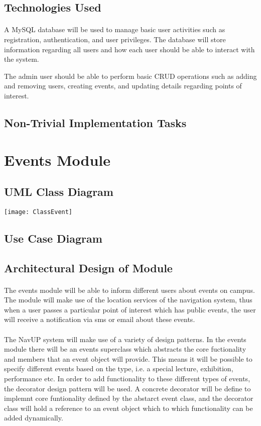\documentclass{article}
\begin{document}
\subsection{Technologies Used}
\paragraph{}A MySQL database will be used to manage basic user activities such as registration, authentication, and user privileges. The database will store information regarding all users and how each user should be able to interact with the system.

The admin user should be able to perform basic CRUD operations such as adding and removing users, creating events, and updating details regarding points of interest. 

\subsection{Non-Trivial Implementation Tasks}


\section{Events Module}
\subsection{UML Class Diagram}
\texttt{[image: ClassEvent]}
\subsection {Use Case Diagram}

\subsection{Architectural Design of Module}
\paragraph{}The events module will be able to inform different users about events on campus. The module will make use of the location services of the navigation system, thus when a user passes a particular point of interest which has public events, the user will receive a notification via sms or email about these events. 

\paragraph{} The NavUP system will make use of a variety of design patterns. In the events module there will be an events superclass which abstracts the core fuctionality and members that an event object will provide. This means it will be possible to specify different events based on the type, i.e. a special lecture, exhibition, performance etc. In order to add functionality to these different types of events, the decorator design pattern will be used. A concrete decorator will be define to implemnt core funtionality defined by the abstarct event class, and the decorator class will hold a reference to an event object which to which functionality can be added dynamically.
\end{document}
